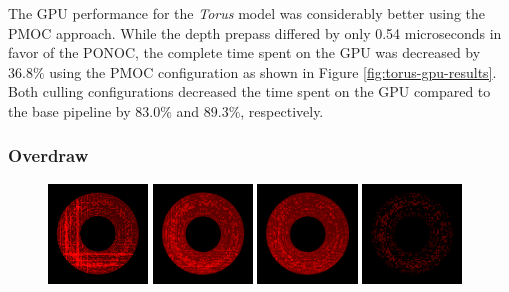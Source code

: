 \noindent
The \ac{GPU} performance for the \emph{Torus} model was considerably better using the \ac{PMOC} approach. 
While the depth prepass differed by only 0.54 microseconds in favor of the \ac{PONOC}, the complete time 
spent on the \ac{GPU} was decreased by $36.8\%$ using the \ac{PMOC} configuration as shown in Figure 
\ref{fig:torus-gpu-results}. \\

\noindent
Both culling configurations decreased the time spent on the \ac{GPU} compared to the base pipeline by 
$83.0\%$ and $89.3\%$, respectively.

\subsubsection*{Overdraw}

\begin{figure}[!htb]
  \centering
  \includegraphics[height=100px]{images/graphics/overdraw-torus1-nocull.png}
  \includegraphics[height=100px]{images/graphics/overdraw-torus1-pooc.png}
  \includegraphics[height=100px]{images/graphics/overdraw-torus1-pmoc.png}
  \includegraphics[height=100px]{images/graphics/overdraw-torus1-diff.png}


\end{figure}

